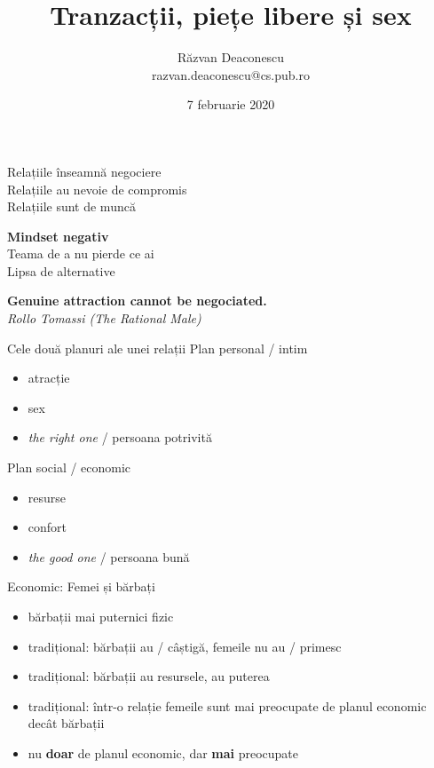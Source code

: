 \documentclass{simple}
\title[Tranzacții, piețe libere și sex]{Tranzacții, piețe libere și sex}
\institute{Unicorns, Fairies, Retards and Assholes Trip}
\author[Răzvan Deaconescu]{Răzvan Deaconescu \\
razvan.deaconescu@cs.pub.ro}
\date{7 februarie 2020}
\begin{document}
\frame{\titlepage}

\begin{frame}{}
  \centering
  \vspace{0.5cm}
  \Large{Relațiile înseamnă negociere} \\
  \vspace{0.5cm}
  \Large{Relațiile au nevoie de compromis} \\
  \vspace{0.5cm}
  \Large{Relațiile sunt de muncă}
\end{frame}

\begin{frame}{}
  \centering
  \vspace{0.5cm}
  \Large{\textbf{Mindset negativ}} \\
  \vspace{0.5cm}
  \Large{Teama de a nu pierde ce ai} \\
  \vspace{0.5cm}
  \Large{Lipsa de alternative}
\end{frame}

\begin{frame}{}
  \centering
  \vspace{0.5cm}
  \Large{\textbf{Genuine attraction cannot be negociated.}} \\
  \vspace{3mm}
  \hfill \textit{Rollo Tomassi (The Rational Male)}
\end{frame}

\begin{frame}{Cele două planuri ale unei relații}
  \Large{Plan personal / intim}
    \begin{itemize}
      \item atracție
      \item sex
      \item \textit{the right one} / persoana potrivită
    \end{itemize}
  \Large{Plan social / economic}
    \begin{itemize}
      \item resurse
      \item confort
      \item \textit{the good one} / persoana bună
    \end{itemize}
\end{frame}

\begin{frame}{Economic: Femei și bărbați}
  \begin{itemize}
    \item bărbații mai puternici fizic
    \item tradițional: bărbații au / câștigă, femeile nu au / primesc
    \item tradițional: bărbații au resursele, au puterea
    \item tradițional: într-o relație femeile sunt mai preocupate de planul economic decât bărbații
    \item nu \textbf{doar} de planul economic, dar \textbf{mai} preocupate
  \end{itemize}
\end{frame}
\end{document}
